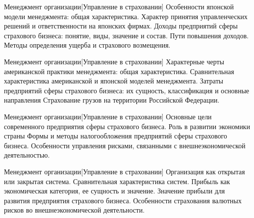 \documentclass[
	11pt,
	a4paper,
	]
	{article}
\begin{document}
\begin{minipage}[t][\miniH]{\miniL}\centering
	 {Менеджмент организации}[Управление в страховании]
		{
			Особенности японской модели менеджмента: общая характеристика. Характер принятия управленческих решений и ответственности на японских фирмах.
		}{
			Доходы предприятий сферы страхового бизнеса: понятие, виды, значение и состав. Пути повышения доходов.
		}{
			Методы определения ущерба и страхового возмещения.
		}
	\lowGE
\end{minipage}

\vfill



\begin{minipage}[t][\miniH]{\miniL}\centering
	 {Менеджмент организации}[Управление в страховании]
		{
			Характерные черты американской практики менеджмента: общая характеристика. Сравнительная характеристика американской и японской моделей менеджмента.
		}{
			Затраты предприятий сферы страхового бизнеса: их сущность, классификация и основные направления
		}{
			Страхование грузов на территории Российской Федерации.
		}
	\lowGE
\end{minipage}

\vfill



\begin{minipage}[t][\miniH]{\miniL}\centering
	 {Менеджмент организации}[Управление в страховании]
		{
			Основные цели современного предприятия сферы страхового бизнеса. Роль в развитии экономики страны
		}{
			Формы и методы налогообложения предприятий сферы страхового бизнеса.
		}{
			Особенности управления рисками, связанными с внешнеэкономической деятельностью.
		}
	\lowGE
\end{minipage}





\begin{minipage}[t][\miniH]{\miniL}\centering
	 {Менеджмент организации}[Управление в страховании]
		{
			Организация как открытая или закрытая система. Сравнительная характеристика систем.
		}{
			Прибыль как экономическая категория, ее сущность и значение. Значение прибыли для развития предприятия страхового бизнеса.
		}{
			Особенности страхования валютных рисков во внешнеэкономической деятельности.
		}
	\lowGE
\end{minipage}
\end{document}
